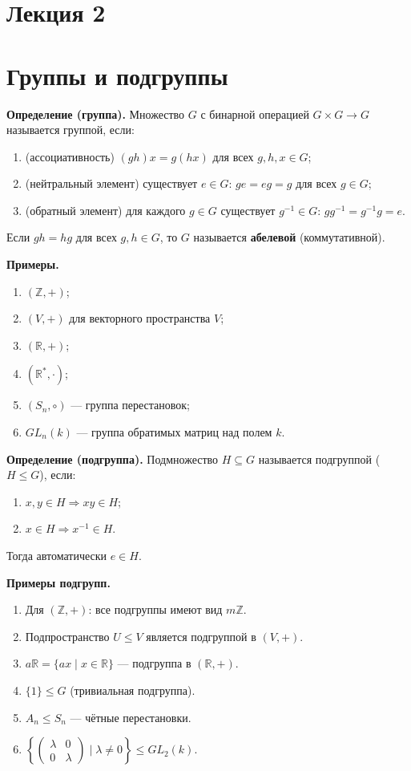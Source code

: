 \documentclass[12pt,a4paper]{article}
\newcommand{\Z}{\mathbb{Z}}
\begin{document}
\section*{\centering Лекция 2}

\section{Группы и подгруппы}

\textbf{Определение (группа).}
Множество $G$ с бинарной операцией $G\times G\to G$ называется группой, если:
\begin{enumerate}
  \item (ассоциативность) $(gh)x=g(hx)$ для всех $g,h,x\in G$;
  \item (нейтральный элемент) существует $e\in G$: $ge=eg=g$ для всех $g\in G$;
  \item (обратный элемент) для каждого $g\in G$ существует $g^{-1}\in G$:
  $gg^{-1}=g^{-1}g=e$.
\end{enumerate}

Если $gh=hg$ для всех $g,h\in G$, то $G$ называется \textbf{абелевой} (коммутативной).

\textbf{Примеры.}
\begin{enumerate}
  \item $(\Z,+)$;
  \item $(V,+)$ для векторного пространства $V$;
  \item $(\mathbb{R},+)$;
  \item $(\mathbb{R}^{\ast},\cdot)$;
  \item $(S_n,\circ)$ — группа перестановок;
  \item $GL_n(k)$ — группа обратимых матриц над полем $k$.
\end{enumerate}

\textbf{Определение (подгруппа).}
Подмножество $H\subseteq G$ называется подгруппой ($H\le G$), если:
\begin{enumerate}
  \item $x,y\in H \Rightarrow xy\in H$;
  \item $x\in H \Rightarrow x^{-1}\in H$.
\end{enumerate}
Тогда автоматически $e\in H$.

\textbf{Примеры подгрупп.}
\begin{enumerate}
  \item Для $(\Z,+)$: все подгруппы имеют вид $m\Z$.
  \item Подпространство $U\le V$ является подгруппой в $(V,+)$.
  \item $a\mathbb{R}=\{ax\mid x\in\mathbb{R}\}$ — подгруппа в $(\mathbb{R},+)$.
  \item $\{1\}\le G$ (тривиальная подгруппа).
  \item $A_n\le S_n$ — чётные перестановки.
  \item $\left\{\begin{pmatrix}\lambda&0\\0&\lambda\end{pmatrix}\mid \lambda\ne 0\right\}\le GL_2(k)$.
\end{enumerate}
\end{document}
